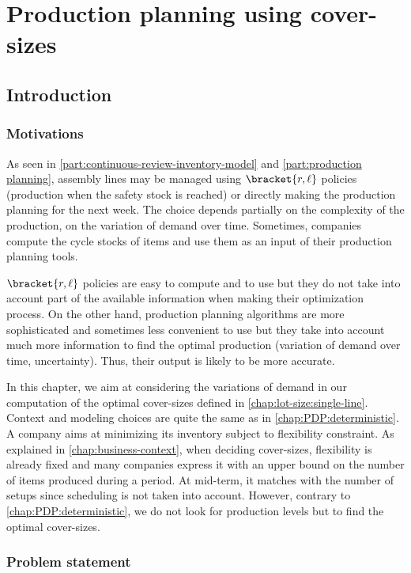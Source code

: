 \chapter{Production planning using cover-sizes}


\section{Introduction}


\subsection{Motivations}


As seen in \cref{part:continuous-review-inventory-model} and \cref{part:production planning}, assembly lines may be managed using $\bracket{r,\ell}$ policies (\ie production when the safety stock is reached) or directly making the production planning for the next week.
The choice depends partially on the complexity of the production, on the variation of demand over time.
Sometimes, companies compute the cycle stocks of items and use them as an input of their production planning tools.


$\bracket{r,\ell}$ policies are easy to compute and to use but they do not take into account part of the available information when making their optimization process.
On the other hand, production planning algorithms are more sophisticated and sometimes less convenient to use but they take into account much more information to find the optimal production (variation of demand over time, uncertainty).
Thus, their output is likely to be more accurate.


In this chapter, we aim at considering the variations of demand in our computation of the optimal cover-sizes defined in \cref{chap:lot-size:single-line}.
Context and modeling choices are quite the same as in \cref{chap:PDP:deterministic}.
A company aims at minimizing its inventory subject to flexibility constraint.
As explained in \cref{chap:business-context}, when deciding cover-sizes, flexibility is already fixed and many companies express it with an upper bound on the number of items produced during a period.
At mid-term, it matches with the number of setups since scheduling is not taken into account.
However, contrary to \cref{chap:PDP:deterministic}, we do not look for production levels but to find the optimal cover-sizes.


\subsection{Problem statement}


